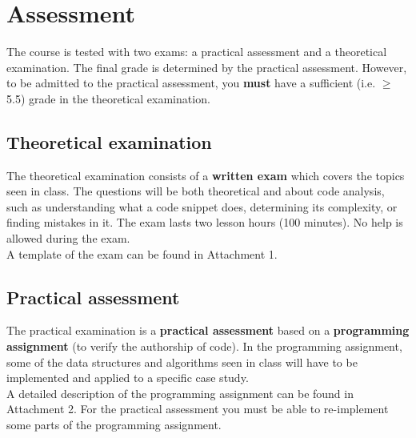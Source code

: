 \section{Assessment}
	The course is tested with two exams: a practical assessment and a theoretical examination. The final grade is determined by the practical assessment. However, to be admitted to the practical assessment, you \textbf{must} have a sufficient (i.e. $\geq$ 5.5) grade in the theoretical examination.

	\subsection{Theoretical examination}
	The theoretical examination consists of a \textbf{written exam} which covers the topics seen in class. The questions will be both theoretical and about code analysis, such as understanding what a code snippet does, determining its complexity, or finding mistakes in it.
	The exam lasts two lesson hours (100 minutes). No help is allowed during the exam.\\
	A template of the exam can be found in Attachment 1.

	\subsection{Practical assessment}
	The practical examination is a \textbf{practical assessment} based on a \textbf{programming assignment} (to verify the authorship of code). In the programming assignment, some of the data structures and algorithms seen in class will have to be implemented and applied to a specific case study.\\ 
	A detailed description of the programming assignment can be found in Attachment 2.
	For the practical assessment you must be able to re-implement some parts of the programming assignment.
	
